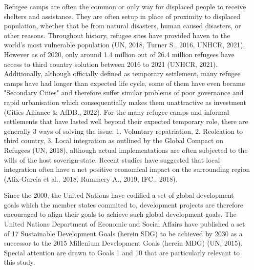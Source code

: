 \documentclass[11pt, a4paper, twoside]{report}
\begin{document}
Refugee camps are often the common or only way for displaced people to receive shelters and assistance. They are often setup in place of proximity to displaced population, whether that be from natural disasters, human caused disasters, or other reasons. Throughout history, refugee sites have provided haven to the world's most vulnerable population (UN, 2018, Turner S., 2016, UNHCR, 2021). However as of 2020, only around 1.4 million out of 26.4 million refugees have access to third country solution between 2016 to 2021 (UNHCR, 2021). Additionally, although officially defined as temporary settlement, many refugee camps have had longer than expected life cycle, some of them have even became "Secondary Cities" and therefore suffer similar problems of poor governance and rapid urbanisation which consequentially makes them unattractive as investment (Cities Alliance \& AfDB., 2022). For the many refugee camps and informal settlements that have lasted well beyond their expected temporary role, there are  generally 3 ways of solving the issue: 1. Voluntary repatriation, 2. Reolcation to third country, 3. Local integration as outlined by the Global Compact on Refugees (UN, 2018), although actual implementations are often subjected to the wills of the host soverign-state. Recent studies have suggested that local integration often have a net positive economical impact on the surrounding region (Alix-Garcia et al., 2018, Rummery A., 2019, IFC., 2018). \\\par

Since the 2000, the United Nations have codified a set of global development goals which the member states commited to, development projects are therefore encouraged to align their goals to achieve such global development goals. The United Nations Department of Economic and Social Affairs have published a set of 17 Sustainable Development Goals (herein SDG) to be achieved by 2030 as a successor to the 2015 Millenium Development Goals (herein MDG) (UN, 2015). Special attention are drawn to Goals 1 and 10 that are particularly relevant to this study.\\\par
\end{document}
